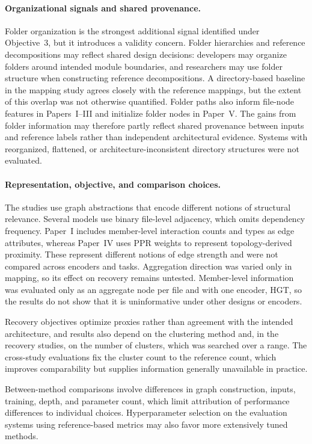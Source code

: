 \paragraph{Organizational signals and shared provenance.} Folder organization is the strongest additional signal identified under Objective~3, but it introduces a validity concern. Folder hierarchies and reference decompositions may reflect shared design decisions: developers may organize folders around intended module boundaries, and researchers may use folder structure when constructing reference decompositions. A directory-based baseline in the mapping study agrees closely with the reference mappings, but the extent of this overlap was not otherwise quantified. Folder paths also inform file-node features in Papers~I--III and initialize folder nodes in Paper~V. The gains from folder information may therefore partly reflect shared provenance between inputs and reference labels rather than independent architectural evidence. Systems with reorganized, flattened, or architecture-inconsistent directory structures were not evaluated.

\paragraph{Representation, objective, and comparison choices.} The studies use graph abstractions that encode different notions of structural relevance. Several models use binary file-level adjacency, which omits dependency frequency. Paper~I includes member-level interaction counts and types as edge attributes, whereas Paper~IV uses PPR weights to represent topology-derived proximity. These represent different notions of edge strength and were not compared across encoders and tasks. Aggregation direction was varied only in mapping, so its effect on recovery remains untested. Member-level information was evaluated only as an aggregate node per file and with one encoder, HGT, so the results do not show that it is uninformative under other designs or encoders.

Recovery objectives optimize proxies rather than agreement with the intended architecture, and results also depend on the clustering method and, in the recovery studies, on the number of clusters, which was searched over a range. The cross-study evaluations fix the cluster count to the reference count, which improves comparability but supplies information generally unavailable in practice.

Between-method comparisons involve differences in graph construction, inputs, training, depth, and parameter count, which limit attribution of performance differences to individual choices. Hyperparameter selection on the evaluation systems using reference-based metrics may also favor more extensively tuned methods.

